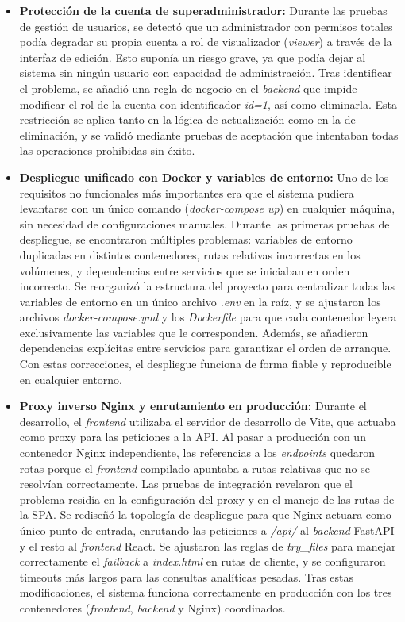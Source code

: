 \begin{itemize}
\item \textbf{Protección de la cuenta de superadministrador:} Durante las pruebas de gestión de usuarios, se detectó que un administrador con permisos totales podía degradar su propia cuenta a rol de visualizador (\emph{viewer}) a través de la interfaz de edición. Esto suponía un riesgo grave, ya que podía dejar al sistema sin ningún usuario con capacidad de administración. Tras identificar el problema, se añadió una regla de negocio en el \textit{backend} que impide modificar el rol de la cuenta con identificador \emph{id=1}, así como eliminarla. Esta restricción se aplica tanto en la lógica de actualización como en la de eliminación, y se validó mediante pruebas de aceptación que intentaban todas las operaciones prohibidas sin éxito.

\item \textbf{Despliegue unificado con Docker y variables de entorno:} Uno de los requisitos no funcionales más importantes era que el sistema pudiera levantarse con un único comando (\emph{docker-compose up}) en cualquier máquina, sin necesidad de configuraciones manuales. Durante las primeras pruebas de despliegue, se encontraron múltiples problemas: variables de entorno duplicadas en distintos contenedores, rutas relativas incorrectas en los volúmenes, y dependencias entre servicios que se iniciaban en orden incorrecto. Se reorganizó la estructura del proyecto para centralizar todas las variables de entorno en un único archivo \emph{.env} en la raíz, y se ajustaron los archivos \emph{docker-compose.yml} y los \emph{Dockerfile} para que cada contenedor leyera exclusivamente las variables que le corresponden. Además, se añadieron dependencias explícitas entre servicios para garantizar el orden de arranque. Con estas correcciones, el despliegue funciona de forma fiable y reproducible en cualquier entorno.

\item \textbf{Proxy inverso Nginx y enrutamiento en producción:} Durante el desarrollo, el \textit{frontend} utilizaba el servidor de desarrollo de Vite, que actuaba como proxy para las peticiones a la API. Al pasar a producción con un contenedor Nginx independiente, las referencias a los \textit{endpoints} quedaron rotas porque el \textit{frontend} compilado apuntaba a rutas relativas que no se resolvían correctamente. Las pruebas de integración revelaron que el problema residía en la configuración del proxy y en el manejo de las rutas de la SPA. Se rediseñó la topología de despliegue para que Nginx actuara como único punto de entrada, enrutando las peticiones a \emph{/api/} al \textit{backend} FastAPI y el resto al \textit{frontend} React. Se ajustaron las reglas de \emph{try\_files} para manejar correctamente el \emph{failback} a \emph{index.html} en rutas de cliente, y se configuraron timeouts más largos para las consultas analíticas pesadas. Tras estas modificaciones, el sistema funciona correctamente en producción con los tres contenedores (\textit{frontend}, \textit{backend} y Nginx) coordinados.


\end{itemize}
